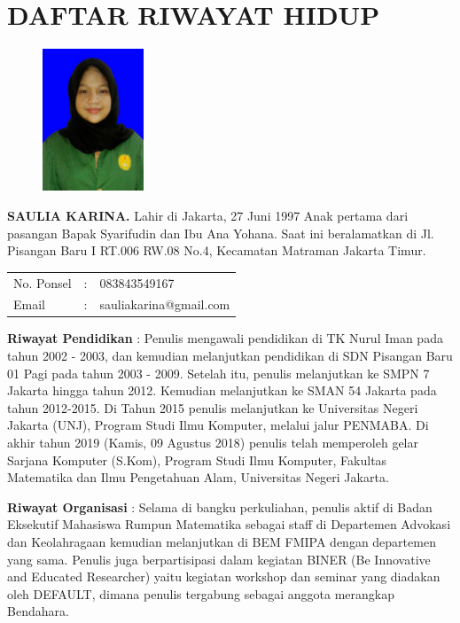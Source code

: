 \pagestyle{empty}
\chapter*{\centering \large DAFTAR RIWAYAT HIDUP}
\thispagestyle{empty}

\begin{figure}
	\vspace{-25pt}
	\begin{center}
		\includegraphics[width=0.27\textwidth]{gambar/pas-foto}
	\end{center}
	\vspace{-80pt}
\end{figure}

\noindent \textbf{SAULIA KARINA.}  Lahir di Jakarta, 27 Juni 1997  Anak pertama dari pasangan Bapak Syarifudin dan Ibu Ana Yohana. Saat ini beralamatkan di Jl. Pisangan Baru I RT.006 RW.08 No.4, Kecamatan Matraman Jakarta Timur.

\vspace{0.5cm}
\noindent
\begin{center}
	\begin{flushright}
		\begin{tabular}{lcl}
			No. Ponsel	& :&  083843549167 \\
			Email	& :&  sauliakarina@gmail.com
		\end{tabular}
	\end{flushright}
\end{center}
\vspace{0.5cm}

\noindent \textbf{Riwayat Pendidikan} : Penulis mengawali pendidikan di TK Nurul Iman pada tahun 2002 - 2003, dan kemudian melanjutkan pendidikan di SDN Pisangan Baru 01 Pagi pada tahun 2003 - 2009. Setelah itu, penulis melanjutkan ke SMPN 7 Jakarta hingga tahun 2012. Kemudian melanjutkan ke SMAN 54 Jakarta pada tahun 2012-2015. Di Tahun 2015 penulis melanjutkan ke Universitas Negeri Jakarta (UNJ), Program Studi Ilmu Komputer, melalui jalur PENMABA. Di akhir tahun 2019 (Kamis, 09 Agustus 2018) penulis telah memperoleh gelar Sarjana Komputer (S.Kom), Program Studi Ilmu Komputer, Fakultas Matematika dan Ilmu Pengetahuan Alam, Universitas Negeri Jakarta.

\noindent \textbf{Riwayat Organisasi} : Selama di bangku perkuliahan, penulis aktif di Badan Eksekutif Mahasiswa Rumpun Matematika sebagai staff di Departemen Advokasi dan Keolahragaan kemudian melanjutkan di BEM FMIPA dengan departemen yang sama. Penulis juga berpartisipasi dalam kegiatan BINER (Be Innovative and Educated Researcher) yaitu kegiatan workshop dan seminar yang diadakan oleh DEFAULT, dimana penulis tergabung sebagai anggota merangkap Bendahara. 